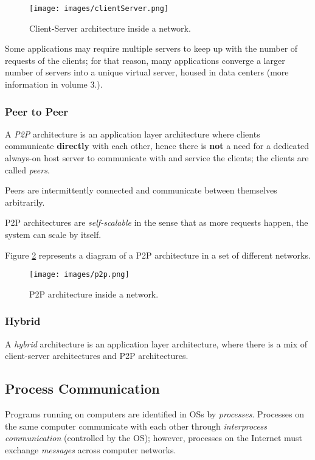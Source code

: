 \begin{figure}[!b]
\centering
\texttt{[image: images/clientServer.png]}
\caption{Client-Server architecture inside a network.}
\label{fig:clientServer}
\end{figure}

Some applications may require multiple servers to keep up with the number of requests of the clients; for that reason, many applications converge a larger number of servers into a unique virtual server, housed in data centers (more information in volume 3.).

\subsubsection{Peer to Peer}
\label{subsubsection:peerToPeer}
A \textit{\ac{P2P}} architecture is an application layer architecture where clients communicate \textbf{directly} with each other, hence there is \textbf{not} a need for a dedicated always-on host server to communicate with and service the clients; the clients are called \textit{peers}.

Peers are intermittently connected and communicate between themselves arbitrarily.

\Ac{P2P} architectures are \textit{self-scalable} in the sense that as more requests happen, the system can scale by itself.

Figure \ref{fig:p2p} represents a diagram of a \ac{P2P} architecture in a set of different networks.

\begin{figure}[!b]
  \centering
  \texttt{[image: images/p2p.png]}
  \caption{\ac{P2P} architecture inside a network.}
  \label{fig:p2p}
\end{figure}

\subsubsection{Hybrid}
\label{subsubsection:hybrid}
A \textit{hybrid} architecture is an application layer architecture, where there is a mix of client-server architectures and \Ac{P2P} architectures.

\subsection{Process Communication}
\label{subsection:processCommunication}
Programs running on computers are identified in \acp{OS} by \textit{processes}. Processes on the same computer communicate with each other through \textit{interprocess communication} (controlled by the \ac{OS}); however, processes on the Internet must exchange \textit{messages} across computer networks.

